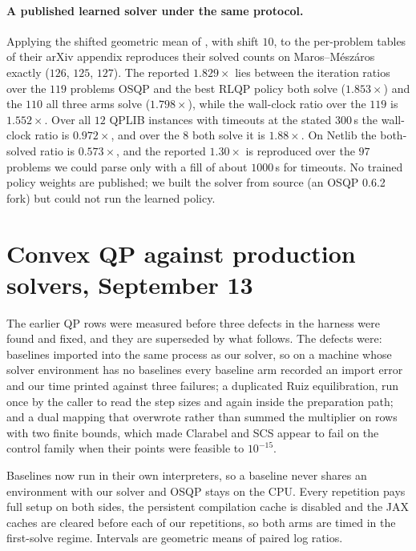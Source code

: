 \documentclass[11pt]{article}
\begin{document}
\paragraph{A published learned solver under the same protocol.}
Applying the shifted geometric mean of \citet{Ichnowski2021Accelerating}, with
shift $10$, to the per-problem tables of their arXiv appendix reproduces their
solved counts on Maros--M\'esz\'aros exactly ($126$, $125$, $127$). The reported $1.829\times$ lies
between the iteration ratios over the $119$ problems OSQP and the best RLQP
policy both solve ($1.853\times$) and the $110$ all three arms solve
($1.798\times$), while the wall-clock ratio over the $119$ is $1.552\times$. Over all $12$ QPLIB instances with timeouts at the stated
$300$\,s the wall-clock ratio is $0.972\times$, and over the $8$ both solve it is
$1.88\times$. On Netlib the both-solved ratio is $0.573\times$, and the reported
$1.30\times$ is reproduced over the $97$ problems we could parse only with a fill
of about $1000$\,s for timeouts. No trained policy weights are published; we built the solver from
source (an OSQP 0.6.2 fork) but could not run the learned policy.

\section{Convex QP against production solvers, September 13}
\label{app:log:qp2026}

The earlier QP rows were measured before three defects in the harness were
found and fixed, and they are superseded by what follows. The defects were:
baselines imported into the same process as our solver, so on a machine whose
solver environment has no baselines every baseline arm recorded an import
error and our time printed against three failures; a duplicated Ruiz
equilibration, run once by the caller to read the step sizes and again inside
the preparation path; and a dual mapping that overwrote rather than summed the
multiplier on rows with two finite bounds, which made Clarabel and SCS appear
to fail on the control family when their points were feasible to $10^{-15}$.

Baselines now run in their own interpreters, so a baseline never shares an
environment with our solver and OSQP stays on the CPU. Every repetition pays
full setup on both sides, the persistent compilation cache is disabled and the
JAX caches are cleared before each of our repetitions, so both arms are timed
in the first-solve regime. Intervals are geometric means of paired log ratios.
\end{document}

